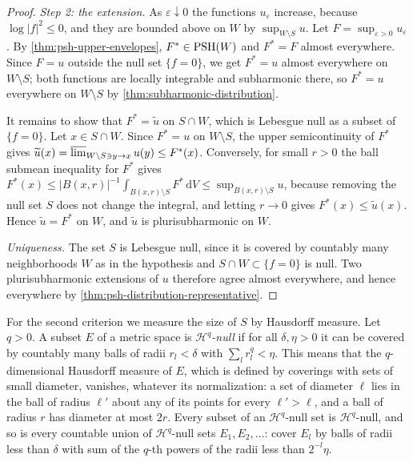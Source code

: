 \begin{proof}
\emph{Step 2: the extension.} As $\varepsilon\downarrow0$ the functions $u_\varepsilon$ increase, because $\log|f|^2\leq0$, and they are bounded above on $W$ by $\sup_{W\setminus S}u$. Let $F=\sup_{\varepsilon>0}u_\varepsilon$. By \cref{thm:psh-upper-envelopes}, $F^*\in\mathrm{PSH}(W)$ and $F^*=F$ almost everywhere. Since $F=u$ outside the null set $\{f=0\}$, we get $F^*=u$ almost everywhere on $W\setminus S$; both functions are locally integrable and subharmonic there, so $F^*=u$ everywhere on $W\setminus S$ by \cref{thm:subharmonic-distribution}.

It remains to show that $F^*=\widetilde u$ on $S\cap W$, which is Lebesgue null as a subset of $\{f=0\}$. Let $x\in S\cap W$. Since $F^*=u$ on $W\setminus S$, the upper semicontinuity of $F^*$ gives $\widetilde u(x)=\varlimsup_{W\setminus S\ni y\to x}u(y)\leq F^*(x)$. Conversely, for small $r>0$ the ball submean inequality for $F^*$ gives $F^*(x)\leq|B(x,r)|^{-1}\int_{B(x,r)\setminus S}F^*\,\mathrm dV\leq\sup_{B(x,r)\setminus S}u$, because removing the null set $S$ does not change the integral, and letting $r\to0$ gives $F^*(x)\leq\widetilde u(x)$. Hence $\widetilde u=F^*$ on $W$, and $\widetilde u$ is plurisubharmonic on $W$.

\emph{Uniqueness.} The set $S$ is Lebesgue null, since it is covered by countably many neighborhoods $W$ as in the hypothesis and $S\cap W\subset\{f=0\}$ is null. Two plurisubharmonic extensions of $u$ therefore agree almost everywhere, and hence everywhere by \cref{thm:psh-distribution-representative}.
\end{proof}

For the second criterion we measure the size of $S$ by Hausdorff measure. Let $q>0$. A subset $E$ of a metric space is \emph{$\mathcal H^q$-null} if for all $\delta,\eta>0$ it can be covered by countably many balls of radii $r_l<\delta$ with $\sum_l r_l^q<\eta$. This means that the $q$-dimensional Hausdorff measure of $E$, which is defined by coverings with sets of small diameter, vanishes, whatever its normalization: a set of diameter $\ell$ lies in the ball of radius $\ell'$ about any of its points for every $\ell'>\ell$, and a ball of radius $r$ has diameter at most $2r$. Every subset of an $\mathcal H^q$-null set is $\mathcal H^q$-null, and so is every countable union of $\mathcal H^q$-null sets $E_1,E_2,\ldots$: cover $E_l$ by balls of radii less than $\delta$ with sum of the $q$-th powers of the radii less than $2^{-l}\eta$.

